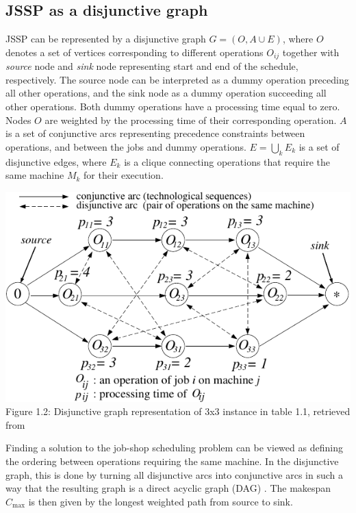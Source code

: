 \subsection{JSSP as a disjunctive graph} \label{JSSP as a disjunctive graph}

JSSP can be represented by a disjunctive graph \cite{YamadaNakanoJSSP, BLAZEWICZ2000317} $G = ( O, A \cup E )$, where $O$ denotes a set of vertices corresponding to different operations $O_{ij}$ together with \textit{source} node and \textit{sink} node representing start and end of the schedule, respectively. The source node can be interpreted as a dummy operation preceding all other operations, and the sink node as a dummy operation succeeding all other operations. Both dummy operations have a processing time equal to zero. Nodes $O$ are weighted by the processing time of their corresponding operation. $A$ is a set of conjunctive arcs representing precedence constraints between operations, and between the jobs and dummy operations. $E = \bigcup_{k} E_k$ is a set of disjunctive edges, where $E_k$ is a clique connecting operations that require the same machine $M_k$ for their execution.
\begin{center}
    \includegraphics[width=0.75\linewidth]{images/jssp_disjunctive_graph.pdf}\\
    Figure 1.2: Disjunctive graph representation of 3x3 instance in table 1.1, retrieved from \cite{YamadaNakanoJSSP}
\end{center}

Finding a solution to the job-shop scheduling problem can be viewed as defining the ordering between operations requiring the same machine. In the disjunctive graph, this is done by turning all disjunctive arcs into conjunctive arcs \cite{YamadaNakanoJSSP, BLAZEWICZ2000317} in such a way that the resulting graph is a direct acyclic graph (DAG) \cite{doi:10.1287/opre.17.6.941}. The makespan $C_\text{max}$ is then given by the longest weighted path from source to sink.

